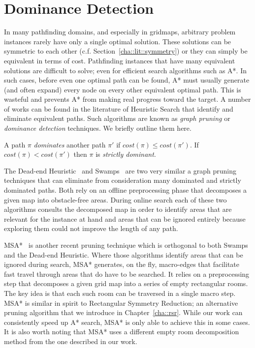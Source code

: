 \section{Dominance Detection}
\label{cha::lit::dominance}
In many pathfinding domains, and especially in gridmaps, arbitrary problem instances rarely
have only a single optimal solution. These solutions can be symmetric to each other 
(c.f. Section~\ref{cha::lit::symmetry}) or they can simply be equivalent in terms of cost.
Pathfinding instances that have many equivalent solutions are difficult to solve; even for 
efficient search algorithms such as A*. In such cases, before even one optimal path can be found,
A* must usually generate (and often expand) every node on every other equivalent optimal path.
This is wasteful and prevents A* from making real progress toward the target. 
A number of works can be found in the literature of Heuristic Search that identify and
eliminate equivalent paths. Such algorithms are known as \emph{graph pruning} 
or \emph{dominance detection} techniques. We briefly outline them here.

\begin{definition}
A path $\pi$ \emph{dominates} another path $\pi'$ if $cost(\pi) \leq cost(\pi')$. 
If $cost(\pi) < cost(\pi')$ then $\pi$ is \emph{strictly dominant}.
\end{definition}

The Dead-end Heuristic~\citep{bjornsson06} and Swamps~\citep{pochter09,pochter10} are two very
similar a graph pruning techniques that can eliminate from consideration many dominated and strictly
dominated paths.  Both rely on an offline preprocessing phase that decomposes a given map into
obstacle-free areas.  During online search each of these two algorithms consults the decomposed map
in order to identify areas that are relevant for the instance at hand and areas that can be ignored
entirely because exploring them could not improve the length of any path.

MSA*~\citep{bolanca09} is another recent pruning technique which is orthogonal to both Swamps and
the Dead-end Heuristic.  Where those algorithms identify areas that can be ignored during search,
MSA* generates, on the fly, macro-edges that facilitate fast travel through areas that do have to be
searched.  It relies on a preprocessing step that decomposes a given grid map into a series of empty
rectangular rooms. The key idea is that each such room can be traversed in a single macro step. MSA* 
is similar in spirit to Rectangular Symmetry Reduction; an alternative pruning
algorithm that we introduce in Chapter~\ref{cha::rsr}.  While our work can consistently speed up A*
search, MSA* is only able to achieve this in some cases.  It is also worth noting that MSA* uses a
different empty room decomposition method from the one described in our work.

